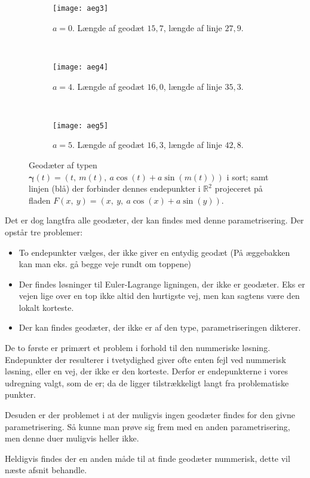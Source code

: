  \begin{figure}
        \centering
        \begin{subfigure}[b]{0.3\textwidth}
                \centering
                \texttt{[image: aeg3]}
                \caption{\(a=0\). Længde af geodæt \(15,7\), længde af linje \(27,9\).}
                \label{fig:aeg3}
        \end{subfigure}%
        ~ %
        \begin{subfigure}[b]{0.3\textwidth}
                \centering
                \texttt{[image: aeg4]}
                \caption{\(a=4\). Længde af geodæt \(16,0\), længde af linje \(35,3\).}
                \label{fig:aeg4}
        \end{subfigure}
        ~ %
        \begin{subfigure}[b]{0.3\textwidth}
                \centering
                \texttt{[image: aeg5]}
                \caption{\(a=5\). Længde af geodæt \(16,3\), længde af linje \(42,8\).}
                \label{fig:aeg5}
        \end{subfigure}
        \caption{
        Geodæter af typen \(\pmb{\gamma}(t) = (t,~m(t),~a\cos(t) + a\sin(m(t)))\) i sort;
        samt linjen (blå) der forbinder dennes endepunkter i \(\mathbb{R}^2\) projeceret på fladen \(F(x,~y)=(x,~y,~a\cos(x)+a\sin(y))\).}%
\end{figure}

Det er dog langtfra alle geodæter, der kan findes med denne parametrisering. Der opstår tre problemer:
\begin{itemize}
\item To endepunkter vælges, der ikke giver en entydig geodæt (På æggebakken kan man eks. gå begge veje rundt om toppene)
\item Der findes løsninger til Euler-Lagrange ligningen, der ikke er geodæter. Eks er vejen lige over en top ikke altid den hurtigste vej,
men kan sagtens være den lokalt korteste.
\item Der kan findes geodæter, der ikke er af den type, parametriseringen dikterer.
\end{itemize}

De to første er primært et problem i forhold til den nummeriske løsning.
Endepunkter der resulterer i tvetydighed giver ofte enten fejl ved nummerisk løsning, eller en vej, der ikke er den korteste.
Derfor er endepunkterne i vores udregning valgt, som de er; da de ligger tilstrækkeligt langt fra problematiske punkter.

Desuden er der problemet i at der muligvis ingen geodæter findes for den givne parametrisering.
Så kunne man prøve sig frem med en anden parametrisering, men denne duer muligvis heller ikke.

Heldigvis findes der en anden måde til at finde geodæter nummerisk, dette vil næste afsnit behandle.

